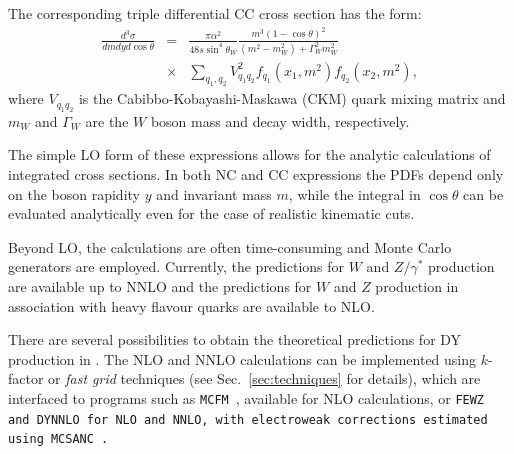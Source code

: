\\
\\
The corresponding triple differential CC cross section has the form:
\begin{eqnarray}
\frac{d^3\sigma}{dmdyd\cos\theta} &=&
 \frac{\pi\alpha^2}{48s\sin^4\theta_W}
 \frac{m^3(1-\cos\theta)^2}{(m^2-m_W^2)+\Gamma_W^2m_W^2}  \nonumber \\
 &\times& \sum_{q_1,q_2}V_{q_1q_2}^2f_{q_1}(x_1,m^2)f_{q_2}(x_2,m^2),
\end{eqnarray}
where \(V_{q_1q_2}\) is the Cabibbo-Kobayashi-Maskawa (CKM) quark mixing matrix and \(m_W\) and \(\Gamma_W\)
are the \(W\) boson mass and decay width, respectively.

The simple LO form of these expressions allows for the analytic calculations of integrated
cross sections.
In both NC and CC expressions the PDFs depend only on the boson rapidity \(y\) and
invariant mass \(m\), while
the integral in \(\cos\theta\) can be evaluated analytically
even for the case of realistic kinematic cuts.
%

Beyond LO, the calculations are often time-consuming and Monte Carlo generators are employed. 
Currently, the predictions for $W$ and $Z/\gamma^*$ production are available up
to NNLO and the predictions for $W$ and $Z$ production in association with heavy flavour quarks are available to NLO.

There are several possibilities to obtain the theoretical
predictions for DY production in \fitter. 
The NLO and NNLO calculations can be implemented using $k$-factor or \emph{fast grid} techniques (see Sec.~\ref{sec:techniques}
for details), which are interfaced to programs such as
\texttt{MCFM}~\cite{Campbell:1999ah,Campbell:2000je,Campbell:2010ff}, 
available for NLO calculations, or 
\tt FEWZ\rm~\cite{FEWZ} and \tt DYNNLO\rm \cite{DYNNLO} for NLO and NNLO, with electroweak corrections estimated using \tt MCSANC\rm~\cite{Bardin:2012jk, Bondarenko:2013nu}.
 

